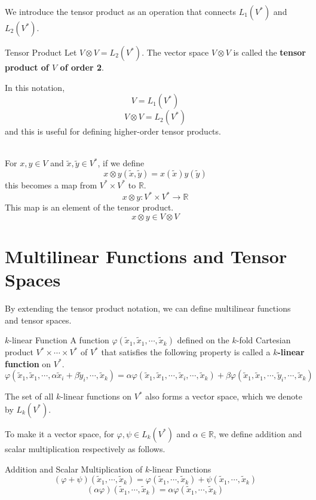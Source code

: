 \documentclass[uplatex,a4j,12pt,dvipdfmx]{jsarticle}
\begin{document}
We introduce the tensor product as an operation that connects $L_{1}(V^{*})$ and $L_{2}(V^{*})$.

\begin{itembox}[l]{Tensor Product}
	Let $V \otimes V = L_{2}(V^{*})$.
	The vector space $V \otimes V$ is called the \textbf{tensor product of $V$ of order 2}.
\end{itembox}

In this notation,
$$V = L_{1}(V^{*})$$
$$V \otimes V = L_{2}(V^{*})$$
and this is useful for defining higher-order tensor products.

\ \\

For $x,y \in V$ and $\tilde{x}, \tilde{y} \in V^{*}$,
if we define
$$
	x \otimes y(\tilde{x}, \tilde{y}) = x(\tilde{x}) y(\tilde{y})
$$
this becomes a map from
$V^{*} \times V^{*}$
to
$\mathbb{R}$.
$$
	x \otimes y : V^{*} \times V^{*} \to \mathbb{R}
$$
This map is an element of the tensor product.
$$
	x \otimes y \in V \otimes V
$$

\section{Multilinear Functions and Tensor Spaces}

By extending the tensor product notation, we can define multilinear functions and tensor spaces.

\begin{itembox}[l]{$k$-linear Function}
	A function
	$\varphi(\tilde{x}_{1}, \tilde{x}_{1}, \cdots , \tilde{x}_{k})$
	defined on the $k$-fold Cartesian product $V^{*} \times \cdots \times V^{*}$ of $V^{*}$
	that satisfies the following property
	is called a \textbf{$k$-linear function} on $V^{*}$.
	$$
		\varphi(\tilde{x}_{1}, \tilde{x}_{1}, \cdots , \alpha \tilde{x}_{i} + \beta \tilde{y}_{i} , \cdots , \tilde{x}_{k})
		=
		\alpha \varphi(\tilde{x}_{1}, \tilde{x}_{1}, \cdots , \tilde{x}_{i} , \cdots , \tilde{x}_{k})
		+
		\beta \varphi(\tilde{x}_{1}, \tilde{x}_{1}, \cdots , \tilde{y}_{i} , \cdots , \tilde{x}_{k})
	$$
\end{itembox}

The set of all $k$-linear functions on $V^{*}$ also forms a vector space,
which we denote by
$L_{k}(V^{*})$.

To make it a vector space,
for $\varphi, \psi \in L_{k}(V^{*})$ and $\alpha \in \mathbb{R}$,
we define addition and scalar multiplication respectively as follows.

\begin{itembox}[l]{Addition and Scalar Multiplication of $k$-linear Functions}
	$$
		( \varphi + \psi ) ( \tilde{x}_{1} , \cdots, \tilde{x}_{k})
		=
		\varphi ( \tilde{x}_{1} , \cdots, \tilde{x}_{k})
		+
		\psi ( \tilde{x}_{1} , \cdots, \tilde{x}_{k})
	$$
	$$
		( \alpha  \varphi ) ( \tilde{x}_{1} , \cdots, \tilde{x}_{k})
		=
		\alpha \varphi ( \tilde{x}_{1} , \cdots, \tilde{x}_{k})
	$$
\end{itembox}
\end{document}
